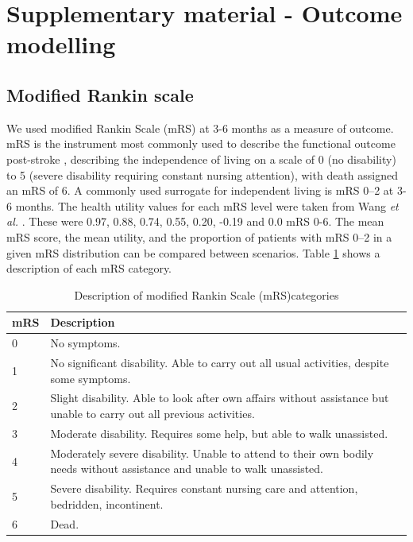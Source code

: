 
\section{Supplementary material - Outcome modelling}

\subsection{Modified Rankin scale}

We used modified Rankin Scale (mRS) at 3-6 months as a measure of outcome. mRS is the instrument most commonly used to describe the functional outcome post-stroke \cite{quinn_functional_2009}, describing the independence of living on a scale of 0 (no disability) to 5 (severe disability requiring constant nursing attention), with death assigned an mRS of 6. A commonly used surrogate for independent living is mRS 0--2 at 3-6 months. The health utility values for each mRS level were taken from Wang \textit{et al.} \cite{wang_utility-weighted_2020}. These were 0.97, 0.88, 0.74, 0.55, 0.20, -0.19 and 0.0 mRS 0-6. The mean mRS score, the mean utility, and the proportion of patients with mRS 0--2 in a given mRS distribution can be compared between scenarios. Table \ref{tab:mrs} shows a description of each mRS category.

\begin{minipage}{1.0\textwidth}  %
\begin{longtable}{p{1.2cm} p{13cm}}
\caption{Description of modified Rankin Scale (mRS)categories}\label{tab:mrs}\\
\toprule
mRS & Description \\
\midrule
0 & No symptoms. \\
1 & No significant disability. Able to carry out all usual activities, despite some symptoms.\\
2 & Slight disability. Able to look after own affairs without assistance but unable to carry out all previous activities. \\
3 & Moderate disability. Requires some help, but able to walk unassisted.\\
4 & Moderately severe disability. Unable to attend to their own bodily needs without assistance and unable to walk unassisted. \\
5 & Severe disability. Requires constant nursing care and attention,
bedridden, incontinent.\\
6 & Dead.\\
\bottomrule
\end{longtable}
\end{minipage} 


